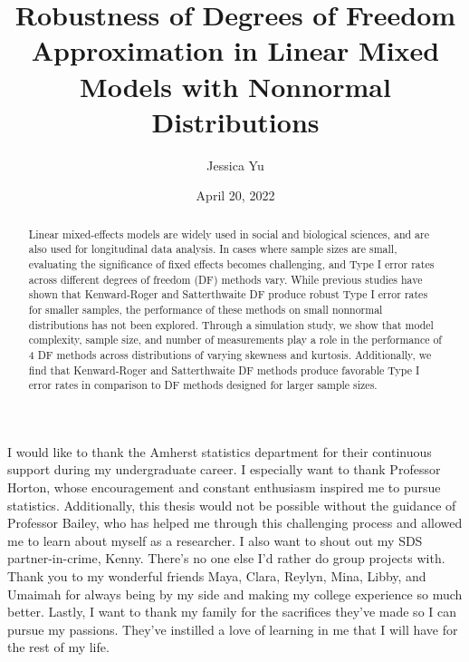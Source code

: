 \documentclass[12pt, twoside]{amherstthesis}
\title{Robustness of Degrees of Freedom Approximation in Linear Mixed Models with Nonnormal Distributions}
\author{Jessica Yu}
\date{April 20, 2022}
\begin{document}
\doublespace
  \maketitle

\frontmatter %
\pagestyle{fancyplain}

  \begin{abstract}
    Linear mixed-effects models are widely used in social and biological sciences, and are also used for longitudinal data analysis. In cases where sample sizes are small, evaluating the significance of fixed effects becomes challenging, and Type I error rates across different degrees of freedom (DF) methods vary. While previous studies have shown that Kenward-Roger and Satterthwaite DF produce robust Type I error rates for smaller samples, the performance of these methods on small nonnormal distributions has not been explored. Through a simulation study, we show that model complexity, sample size, and number of measurements play a role in the performance of 4 DF methods across distributions of varying skewness and kurtosis. Additionally, we find that Kenward-Roger and Satterthwaite DF methods produce favorable Type I error rates in comparison to DF methods designed for larger sample sizes.
  \end{abstract}
  \begin{acknowledgments}
    I would like to thank the Amherst statistics department for their continuous support during my undergraduate career. I especially want to thank Professor Horton, whose encouragement and constant enthusiasm inspired me to pursue statistics. Additionally, this thesis would not be possible without the guidance of Professor Bailey, who has helped me through this challenging process and allowed me to learn about myself as a researcher. I also want to shout out my SDS partner-in-crime, Kenny. There's no one else I'd rather do group projects with. Thank you to my wonderful friends Maya, Clara, Reylyn, Mina, Libby, and Umaimah for always being by my side and making my college experience so much better. Lastly, I want to thank my family for the sacrifices they've made so I can pursue my passions. They've instilled a love of learning in me that I will have for the rest of my life.
  \end{acknowledgments}

  \hypersetup{linkcolor=black}
  \setcounter{tocdepth}{2}
  \tableofcontents
\end{document}
